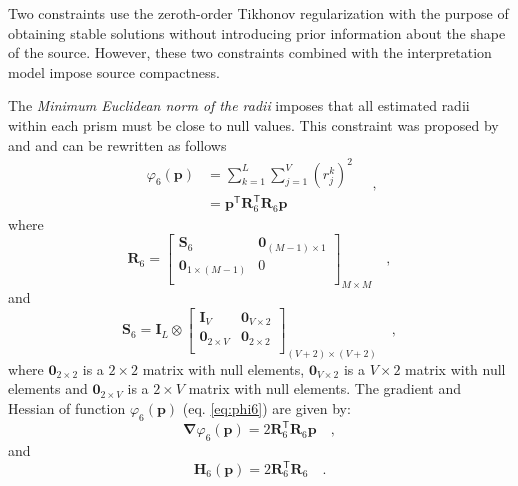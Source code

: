 Two constraints use the zeroth-order Tikhonov regularization with the purpose of obtaining stable solutions without introducing prior information about the shape of the source. 
However, these two constraints combined with the interpretation model impose 
source compactness. 

The \textit{Minimum Euclidean norm of the radii} imposes that 
all estimated radii within each prism must be close to null values. This constraint was proposed by \cite{oliveirajr-etal2011} and \cite{oliveirajr-barbosa2013} and can be rewritten as follows
\begin{equation}\label{eq:phi6}
\begin{split}
\varphi_{6}(\mathbf{p}) &= \sum\limits^{L}_{k=1}\sum\limits^{V}_{j=1}\left(r_{j}^{k}\right)^2 \\
&= \mathbf{p}^{\mathsf{T}} \mathbf{R}_{6}^{\mathsf{T}} \mathbf{R}_{6} \mathbf{p}
\end{split} \quad ,
\end{equation}
where
\begin{equation}
\mathbf{R}_{6} = 
\begin{bmatrix}
\mathbf{S}_{6} & \mathbf{0}_{(M-1) \times 1} \\
\mathbf{0}_{1 \times (M-1)} & 0 \\
\end{bmatrix}_{M\times M} \quad ,
\label{eq:R6-matrix}
\end{equation}
and 
\begin{equation}
\mathbf{S}_{6} = 
\mathbf{I}_{L} \otimes 
\begin{bmatrix}
\mathbf{I}_{V}            & \mathbf{0}_{V \times 2} \\
\mathbf{0}_{2 \times V} & \mathbf{0}_{2 \times 2} \\
\end{bmatrix}_{(V+2) \times (V+2)} \quad ,
\label{eq:S6-matrix}
\end{equation}
where $\mathbf{0}_{2 \times 2}$ is a $2 \times 2$ matrix with null elements,
$\mathbf{0}_{V \times 2}$ is a $V \times 2$ matrix with null elements and
$\mathbf{0}_{2 \times V}$ is a $2 \times V$ matrix with null elements.
The gradient and Hessian of function $\varphi_{6}(\mathbf{p})$ (eq. \ref{eq:phi6}) are given by:
\begin{equation}\label{eq:phi6_grad}
\boldsymbol{\nabla}\varphi_{6}(\mathbf{p}) = 2 \mathbf{R}_{6}^{\mathsf{T}} \mathbf{R}_{6} \mathbf{p} \quad ,
\end{equation}
and
\begin{equation}\label{eq:phi6_hessian}
\mathbf{H}_{6}(\mathbf{p}) = 2 \mathbf{R}^{\mathsf{T}}_{6}\mathbf{R}_{6} \quad .
\end{equation}

